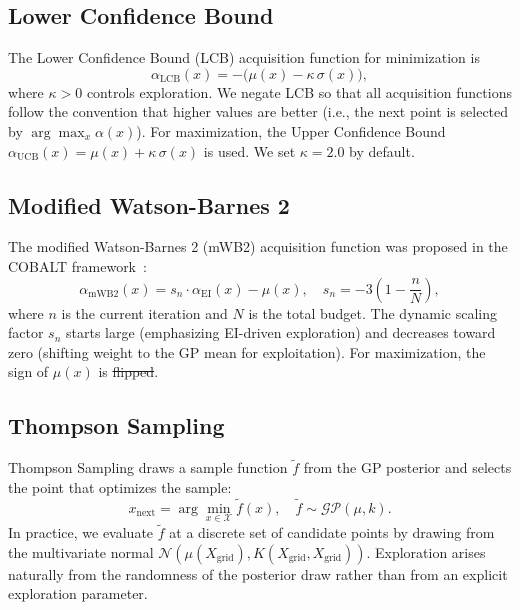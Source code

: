 \documentclass[12pt,a4paper]{article}%
\theoremstyle{plain}%
\theoremstyle{remark}%
\theoremstyle{definition}%
\providecommand{\DIFaddtex}[1]{{\protect\color{blue}\uwave{#1}}} %
\providecommand{\DIFdeltex}[1]{{\protect\color{red}\sout{#1}}}                      %
\providecommand{\DIFaddbegin}{} %
\providecommand{\DIFaddend}{} %
\providecommand{\DIFdelbegin}{} %
\providecommand{\DIFdelend}{} %
\providecommand{\DIFadd}[1]{\texorpdfstring{\DIFaddtex{#1}}{#1}} %
\providecommand{\DIFdel}[1]{\texorpdfstring{\DIFdeltex{#1}}{}} %
\newcommand{\DIFscaledelfig}{0.5}
\newlength{\DIFdelgraphicswidth} %
\newlength{\DIFdelgraphicsheight} %
\newcommand{\DIFaddincludegraphics}[2][]{{\color{blue}\fbox{\DIFOincludegraphics[#1]{#2}}}} %
\newcommand{\DIFdelincludegraphics}[2][]{%
\sbox{\DIFdelgraphicsbox}{\DIFOincludegraphics[#1]{#2}}%
\settoboxwidth{\DIFdelgraphicswidth}{\DIFdelgraphicsbox} %
\settoboxtotalheight{\DIFdelgraphicsheight}{\DIFdelgraphicsbox} %
\scalebox{\DIFscaledelfig}{%
\parbox[b]{\DIFdelgraphicswidth}{\usebox{\DIFdelgraphicsbox}\\[-\baselineskip] \rule{\DIFdelgraphicswidth}{0em}}\llap{\resizebox{\DIFdelgraphicswidth}{\DIFdelgraphicsheight}{%
\setlength{\unitlength}{\DIFdelgraphicswidth}%
\begin{picture}(1,1)%
\thicklines\linethickness{2pt} %
{\color[rgb]{1,0,0}\put(0,0){\framebox(1,1){}}}%
{\color[rgb]{1,0,0}\put(0,0){\line( 1,1){1}}}%
{\color[rgb]{1,0,0}\put(0,1){\line(1,-1){1}}}%
\end{picture}%
}\hspace*{3pt}}} %
} %
\DeclareRobustCommand{\DIFaddbegin}{\DIFOaddbegin \let\includegraphics\DIFaddincludegraphics} %
\DeclareRobustCommand{\DIFaddend}{\DIFOaddend \let\includegraphics\DIFOincludegraphics} %
\DeclareRobustCommand{\DIFdelbegin}{\DIFOdelbegin \let\includegraphics\DIFdelincludegraphics} %
\DeclareRobustCommand{\DIFdelend}{\DIFOaddend \let\includegraphics\DIFOincludegraphics} %
\begin{document}
\begin{appendices}
\subsection{Lower Confidence Bound}\label{subsec:app_lcb}

The Lower Confidence Bound (LCB) acquisition function for minimization is
\begin{equation}\label{eq:lcb}
    \alpha_\text{LCB}(x) = -\bigl(\mu(x) - \kappa\,\sigma(x)\bigr),
\end{equation}
where $\kappa > 0$ controls exploration. We negate LCB so that all acquisition functions follow the convention that higher values are better (i.e., the next point is selected by $\arg\max_x \alpha(x)$). For maximization, the Upper Confidence Bound $\alpha_\text{UCB}(x) = \mu(x) + \kappa\,\sigma(x)$ is used. We set $\kappa = 2.0$ by default.

\subsection{Modified Watson-Barnes 2}\label{subsec:app_mwb2}

The modified Watson-Barnes 2 (mWB2) acquisition function was proposed in the COBALT framework~\cite{paulson2022cobalt}:
\begin{equation}\label{eq:mwb2}
    \alpha_\text{mWB2}(x) = s_n \cdot \alpha_\text{EI}(x) - \mu(x), \quad s_n = -3\left(1 - \frac{n}{N}\right),
\end{equation}
where $n$ is the current iteration and $N$ is the total budget. The dynamic scaling factor $s_n$ starts large (emphasizing EI-driven exploration) and decreases toward zero (shifting weight to the GP mean for exploitation). For maximization, the sign of $\mu(x)$ is \DIFdelbegin \DIFdel{flipped}\DIFdelend \DIFaddbegin \DIFadd{reversed}\DIFaddend .

\subsection{Thompson Sampling}\label{subsec:app_thompson}

Thompson Sampling draws a sample function $\tilde{f}$ from the GP posterior and selects the point that optimizes the sample:
\begin{equation}\label{eq:thompson}
    x_\text{next} = \arg\min_{x \in \mathcal{X}} \tilde{f}(x), \quad \tilde{f} \sim \mathcal{GP}(\mu, k).
\end{equation}
In practice, we evaluate $\tilde{f}$ at a discrete set of candidate points by drawing from the multivariate normal $\mathcal{N}(\mu(X_\text{grid}), K(X_\text{grid}, X_\text{grid}))$. Exploration arises naturally from the randomness of the posterior draw rather than from an explicit exploration parameter.


\end{appendices}
\end{document}
